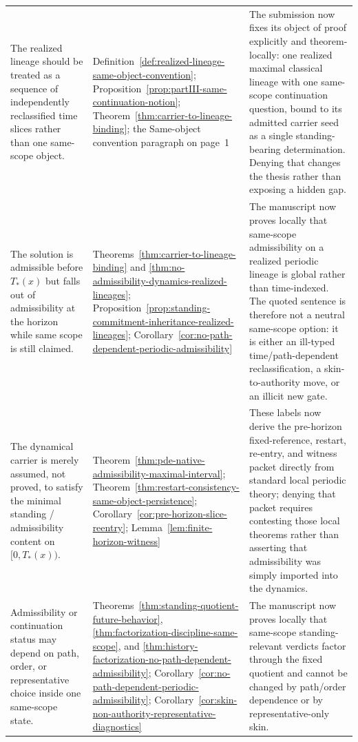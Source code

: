 \begin{tcolorbox}[title={Denial map: what must be denied to keep each objection alive}, colback=blue!2!white, colframe=blue!55!black, boxsep=1pt, left=2pt, right=2pt, top=2pt, bottom=2pt]
\begin{tabularx}{\textwidth}{@{}L{0.33\textwidth}L{0.31\textwidth}Y@{}}
The realized lineage should be treated as a sequence of independently reclassified time slices rather than one same-scope object. & Definition~\ref{def:realized-lineage-same-object-convention}; Proposition~\ref{prop:partIII-same-continuation-notion}; Theorem~\ref{thm:carrier-to-lineage-binding}; the Same-object convention paragraph on page~1 & The submission now fixes its object of proof explicitly and theorem-locally: one realized maximal classical lineage with one same-scope continuation question, bound to its admitted carrier seed as a single standing-bearing determination. Denying that changes the thesis rather than exposing a hidden gap.\\
The solution is admissible before $T_*(x)$ but falls out of admissibility at the horizon while same scope is still claimed. & Theorems~\ref{thm:carrier-to-lineage-binding} and \ref{thm:no-admissibility-dynamics-realized-lineages}; Proposition~\ref{prop:standing-commitment-inheritance-realized-lineages}; Corollary~\ref{cor:no-path-dependent-periodic-admissibility} & The manuscript now proves locally that same-scope admissibility on a realized periodic lineage is global rather than time-indexed. The quoted sentence is therefore not a neutral same-scope option: it is either an ill-typed time/path-dependent reclassification, a skin-to-authority move, or an illicit new gate.\\
The dynamical carrier is merely assumed, not proved, to satisfy the minimal standing / admissibility content on $[0,T_*(x))$. & Theorem~\ref{thm:pde-native-admissibility-maximal-interval}; Theorem~\ref{thm:restart-consistency-same-object-persistence}; Corollary~\ref{cor:pre-horizon-slice-reentry}; Lemma~\ref{lem:finite-horizon-witness} & These labels now derive the pre-horizon fixed-reference, restart, re-entry, and witness packet directly from standard local periodic theory; denying that packet requires contesting those local theorems rather than asserting that admissibility was simply imported into the dynamics.\\
Admissibility or continuation status may depend on path, order, or representative choice inside one same-scope state. & Theorems~\ref{thm:standing-quotient-future-behavior}, \ref{thm:factorization-discipline-same-scope}, and \ref{thm:history-factorization-no-path-dependent-admissibility}; Corollary~\ref{cor:no-path-dependent-periodic-admissibility}; Corollary~\ref{cor:skin-non-authority-representative-diagnostics} & The manuscript now proves locally that same-scope standing-relevant verdicts factor through the fixed quotient and cannot be changed by path/order dependence or by representative-only skin.\\
\bottomrule
\end{tabularx}
\end{tcolorbox}

